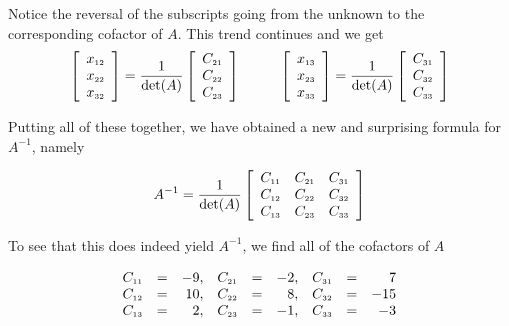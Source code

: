 Notice the reversal of the subscripts going from the unknown to the corresponding cofactor of $A$. This trend continues and we get
\[ \begin{array}{cc}

\left[ \begin{array}{r} x_{\mbox{\tiny$12$}} \\ x_{\mbox{\tiny$22$}} \\ x_{\mbox{\tiny$32$}} \end{array} \right] =  \dfrac{1}{\det(A)} \left[ \begin{array}{r} C_{\mbox{\tiny$21$}} \\ C_{\mbox{\tiny$22$}} \\ C_{\mbox{\tiny$23$}} \end{array} \right]

&
\qquad

\left[ \begin{array}{r} x_{\mbox{\tiny$13$}} \\ x_{\mbox{\tiny$23$}} \\ x_{\mbox{\tiny$33$}} \end{array} \right] =  \dfrac{1}{\det(A)} \left[ \begin{array}{r} C_{\mbox{\tiny$31$}} \\ C_{\mbox{\tiny$32$}} \\ C_{\mbox{\tiny$33$}} \end{array} \right]

\end{array}\]

Putting all of these together, we have obtained a new and surprising formula for $A^{-1}$, namely

\[ A^{-1} = \dfrac{1}{\det(A)} \left[ \begin{array}{ccc} C_{\mbox{\tiny$11$}} & C_{\mbox{\tiny$21$}} & C_{\mbox{\tiny$31$}} \\ C_{\mbox{\tiny$12$}} & C_{\mbox{\tiny$22$}} & C_{\mbox{\tiny$32$}} \\ C_{\mbox{\tiny$13$}} & C_{\mbox{\tiny$23$}} & C_{\mbox{\tiny$33$}} \\ \end{array} \right] \]

To see that this does indeed yield $A^{-1}$, we find all of the cofactors of $A$

\[\begin{array}{rcrrcrrcr}

C_{\mbox{\tiny$11$}} & = & -9, & C_{\mbox{\tiny$21$}} & = & -2, & C_{\mbox{\tiny$31$}} & = & 7\\

C_{\mbox{\tiny$12$}} & = & 10, & C_{\mbox{\tiny$22$}} & = & 8, & C_{\mbox{\tiny$32$}} & = & -15 \\

C_{\mbox{\tiny$13$}} & = &  2,  & C_{\mbox{\tiny$23$}} & = & -1,  & C_{\mbox{\tiny$33$}} & = & -3 \\

\end{array} \]

